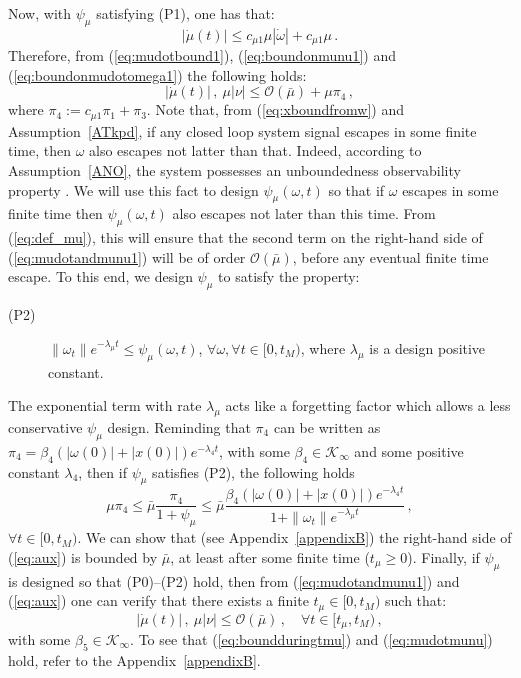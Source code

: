 \documentclass{rncauth}
\begin{document}
Now, with $\psi_\mu$ satisfying (P1), one has that:
%
\begin{equation}
|\dot{\mu}(t)|\!\leq\!c_{\mu 1} \mu |\dot{\omega}|+c_{\mu 1}
\mu\,. \label{eq:mudotbound1}
\end{equation}
%
Therefore, from (\ref{eq:mudotbound1}), (\ref{eq:boundonmunu1})
and (\ref{eq:boundonmudotomega1}) the following holds:
%
\begin{equation}
|\dot{\mu}(t)|\,, \ \mu|\nu| \leq \mathcal{O}(\bar{\mu}) + \mu
\pi_4\,, \label{eq:mudotandmunu1}
\end{equation}
%
where $\pi_4:=c_{\mu 1} \pi_1 +\pi_3$.
%
Note that, from (\ref{eq:xboundfromw}) and Assumption~\ref{ATkpd},
if any closed loop system signal escapes in some finite time, then
$\omega$ also escapes not latter than that. Indeed, according to
Assumption~\ref{ANO}, the system possesses an unboundedness
observability property \cite{AS:99}. We will use this fact to
design $\psi_\mu(\omega,t)$ so that if $\omega$ escapes in some
finite time then $\psi_\mu(\omega,t)$ also escapes not later than
this time. From (\ref{eq:def_mu}), this will ensure that the
second term on the right-hand side of (\ref{eq:mudotandmunu1})
will be of order $\mathcal{O}(\bar{\mu})$, before any eventual
finite time escape.
%
To this end, we design $\psi_\mu$ to satisfy the property: 
%
\begin{description}
\item[(P2)] $\|\omega_{t}\| e^{-\lambda_\mu t} \leq
\psi_\mu(\omega,t)$, $\forall \omega, \forall t \in [0,t_M)$,
where $\lambda_\mu$ is a design positive constant.
\end{description}
%
The exponential term with rate $\lambda_\mu$ acts like a
forgetting factor which allows a less conservative $\psi_\mu$
design. Reminding that $\pi_4$ can be written as
$\pi_4=\beta_4(|\omega(0)|+|x(0)|) e^{-\lambda_4 t}$, with some
$\beta_4 \in \mathcal{K}_\infty$ and some positive constant
$\lambda_4$, then if $\psi_\mu$ satisfies (P2), the following
holds
%
\begin{equation}
\mu \pi_4 \leq \bar{\mu}\frac{\pi_4}{1+\psi_\mu} \leq
\bar{\mu}\frac{\beta_4(|\omega(0)|+|x(0)|) e^{-\lambda_4
t}}{1+\|\omega_{t}\| e^{-\lambda_\mu t}}\,, \label{eq:aux}
\end{equation}
%
$\forall t\!\in\![0,t_M)$.
%
We can show that (see Appendix~\ref{appendixB}) the right-hand
side of (\ref{eq:aux}) is bounded by $\bar{\mu}$, at least after
some finite time ($t_\mu\geq 0$).
%
Finally, if $\psi_\mu$ is designed so that (P0)--(P2) hold, then
from (\ref{eq:mudotandmunu1}) and (\ref{eq:aux}) one can verify
that there exists a finite $t_\mu \in [0,t_M)$ such that:
%
\begin{equation}
|\dot{\mu}(t)|\,, \ \mu |\nu| \leq \mathcal{O}(\bar{\mu})\,, \quad
\forall t \in [t_\mu,t_M)\,, \label{eq:mudotmunu}
\end{equation}
%
with some $\beta_5 \in \mathcal{K}_\infty$. To see that
(\ref{eq:boundduringtmu}) and (\ref{eq:mudotmunu}) hold, refer to
the Appendix~\ref{appendixB}.
\end{document}

